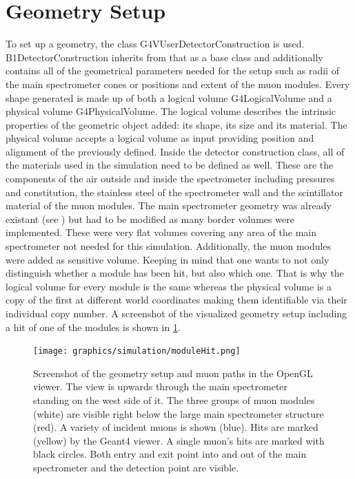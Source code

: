   \section{Geometry Setup}
  \label{ch:Simulation software:sec:Geometry setup}
  To set up a geometry, the class G4VUserDetectorConstruction is used. B1DetectorConstruction inherits from that as a base class and additionally contains all of the geometrical parameters needed for the setup such as radii of the main spectrometer cones or positions and extent of the muon modules. Every shape generated is made up of both a logical volume G4LogicalVolume and a physical volume G4PhysicalVolume. The logical volume describes the intrinsic properties of the geometric object added: its shape, its size and its material. The physical volume accepts a logical volume as input providing position and alignment of the previously defined.
  Inside the detector construction class, all of the materials used in the simulation need to be defined as well. These are the components of the air outside and inside the spectrometer including pressures and constitution, the stainless steel of the spectrometer wall and the scintillator material of the muon modules.
  The main spectrometer geometry was already existant (see \cite{mainSpecGeometry}) but had to be modified as many border volumes were implemented. These were very flat volumes covering any area of the main spectrometer not needed for this simulation. Additionally, the muon modules were added as sensitive volume. Keeping in mind that one wants to not only distinguish whether a module has been hit, but also which one. That is why the logical volume for every module is the same whereas the physical volume is a copy of the first at different world coordinates making them identifiable via their individual copy number. A screenshot of the visualized geometry setup including a hit of one of the modules is shown in \ref{fig:geant:geometry}.
  
  \begin{figure}
  	\centering
  	\texttt{[image: graphics/simulation/moduleHit.png]}
  	\caption[Simulation geometry setup]{Screenshot of the geometry setup and muon paths in the OpenGL viewer. The view is upwards through the main spectrometer standing on the west side of it. The three groups of muon modules (white) are visible right below the large main spectrometer structure (red). A variety of incident muons is shown (blue). Hits are marked (yellow) by the Geant4 viewer. A single muon's hits are marked with black circles. Both entry and exit point into and out of the main spectrometer and the detection point are visible.}
  	\label{fig:geant:geometry}
  \end{figure}

